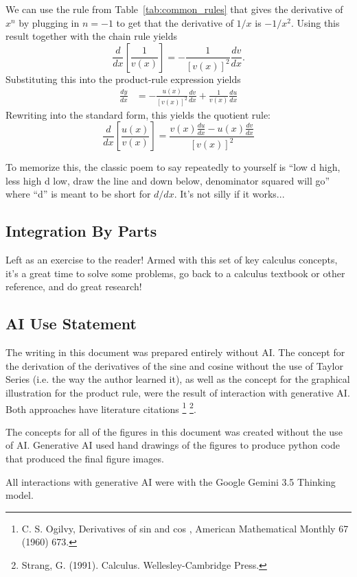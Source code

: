 \documentclass[12pt]{article}
\begin{document}
We can use the rule from Table~\ref{tab:common_rules} that gives the derivative of $x^n$ by plugging in $n=-1$ to get that the derivative of $1/x$ is $-1/x^2$. Using this result together with the chain rule yields
\begin{equation}
\frac{d}{dx}\left[\frac{1}{v(x)}\right]
= -\frac{1}{[v(x)]^2}\frac{dv}{dx}.
\end{equation}
Substituting this into the product-rule expression yields
\begin{align}
\frac{dy}{dx}
&= -\frac{u(x)}{[v(x)]^2}\frac{dv}{dx}
   + \frac{1}{v(x)}\frac{du}{dx}
\end{align}
Rewriting into the standard form, this yields the quotient rule:
\begin{equation}
\frac{d}{dx}\left[\frac{u(x)}{v(x)}\right]
= \frac{v(x)\frac{du}{dx}
-u(x)\frac{dv}{dx}}{[v(x)]^2}
\end{equation}

To memorize this, the classic poem to say repeatedly to yourself is ``low d high, less high d low, draw the line and down below, denominator squared will go'' where ``d'' is meant to be short for $d/dx$. It's not silly if it works...

\subsection{Integration By Parts}

Left as an exercise to the reader! Armed with this set of key calculus concepts, it's a great time to solve some problems, go back to a calculus textbook or other reference, and do great research!

\subsection*{AI Use Statement}

The writing in this document was prepared entirely without AI. The concept for the derivation of the derivatives of the sine and cosine without the use of Taylor Series (i.e. the way the author learned it), as well as the concept for the graphical illustration for the product rule, were the result of interaction with generative AI. Both approaches have literature citations \footnote{C. S. Ogilvy, Derivatives of sin and cos , American Mathematical Monthly 67 (1960) 673.} \footnote{Strang, G. (1991). Calculus. Wellesley-Cambridge Press.}.

The concepts for all of the figures in this document was created without the use of AI. Generative AI used hand drawings of the figures to produce python code that produced the final figure images.

All interactions with generative AI were with the Google Gemini 3.5 Thinking model.
\end{document}
